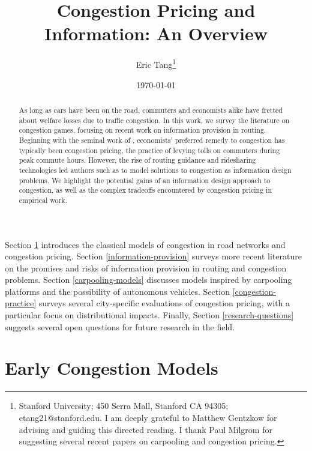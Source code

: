 \documentclass[JEL]{AEA}
\begin{document}
\title{Congestion Pricing and Information: An Overview}
\author{Eric Tang\thanks{%
Stanford University; 450 Serra Mall, Stanford CA 94305; etang21@stanford.edu.
I am deeply grateful to Matthew Gentzkow for advising and guiding this directed reading. I thank Paul Milgrom for suggesting several recent papers on carpooling and congestion pricing.
}}
\date{\today}
\pubVolume{}
\pubIssue{}

\begin{abstract}
As long as cars have been on the road, commuters and economists alike have fretted about welfare losses due to traffic congestion. In this work, we survey the literature on congestion games, focusing on recent work on information provision in routing. Beginning with the seminal work of \cite{vickrey-1969}, economists' preferred remedy to congestion has typically been congestion pricing, the practice of levying tolls on commuters during peak commute hours. However, the rise of routing guidance and ridesharing technologies led authors such as \cite{das-2017} to model solutions to congestion as information design problems. We highlight the potential gains of an information design approach to congestion, as well as the complex tradeoffs encountered by congestion pricing in empirical work.
\end{abstract}

\maketitle


Section \ref{early-congestion-models} introduces the classical models of congestion in road networks and congestion pricing. Section \ref{information-provision} surveys more recent literature on the promises and risks of information provision in routing and congestion problems. Section \ref{carpooling-models} discusses models inspired by carpooling platforms and the possibility of autonomous vehicles. Section \ref{congestion-practice} surveys several city-specific evaluations of congestion pricing, with a particular focus on distributional impacts. Finally, Section \ref{research-questions} suggests several open questions for future research in the field.

\section{Early Congestion Models}
\label{early-congestion-models}
\end{document}
